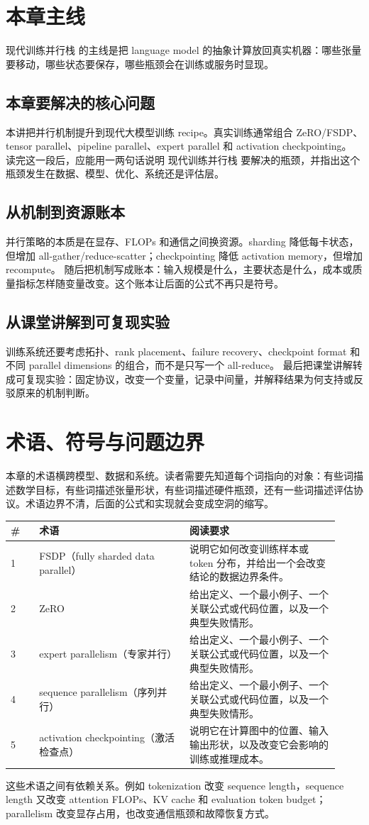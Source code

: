 \documentclass[a4paper]{article}
\begin{document}
\section{本章主线}
现代训练并行栈 的主线是把 language model 的抽象计算放回真实机器：哪些张量要移动，哪些状态要保存，哪些瓶颈会在训练或服务时显现。
\subsection{本章要解决的核心问题}
本讲把并行机制提升到现代大模型训练 recipe。真实训练通常组合 ZeRO/FSDP、tensor parallel、pipeline parallel、expert parallel 和 activation checkpointing。
读完这一段后，应能用一两句话说明 现代训练并行栈 要解决的瓶颈，并指出这个瓶颈发生在数据、模型、优化、系统还是评估层。
\subsection{从机制到资源账本}
并行策略的本质是在显存、FLOPs 和通信之间换资源。sharding 降低每卡状态，但增加 all-gather/reduce-scatter；checkpointing 降低 activation memory，但增加 recompute。
随后把机制写成账本：输入规模是什么，主要状态是什么，成本或质量指标怎样随变量改变。这个账本让后面的公式不再只是符号。
\subsection{从课堂讲解到可复现实验}
训练系统还要考虑拓扑、rank placement、failure recovery、checkpoint format 和不同 parallel dimensions 的组合，而不是只写一个 all-reduce。
最后把课堂讲解转成可复现实验：固定协议，改变一个变量，记录中间量，并解释结果为何支持或反驳原来的机制判断。
\section{术语、符号与问题边界}
本章的术语横跨模型、数据和系统。读者需要先知道每个词指向的对象：有些词描述数学目标，有些词描述张量形状，有些词描述硬件瓶颈，还有一些词描述评估协议。术语边界不清，后面的公式和实现就会变成空洞的缩写。
\begin{longtable}{p{0.08\linewidth}p{0.42\linewidth}p{0.42\linewidth}}
\toprule
\textbf{\#} & \textbf{术语} & \textbf{阅读要求}\\
\midrule
1 & FSDP（fully sharded data parallel） & 说明它如何改变训练样本或 token 分布，并给出一个会改变结论的数据边界条件。\\
2 & ZeRO & 给出定义、一个最小例子、一个关联公式或代码位置，以及一个典型失败情形。\\
3 & expert parallelism（专家并行） & 给出定义、一个最小例子、一个关联公式或代码位置，以及一个典型失败情形。\\
4 & sequence parallelism（序列并行） & 给出定义、一个最小例子、一个关联公式或代码位置，以及一个典型失败情形。\\
5 & activation checkpointing（激活检查点） & 说明它在计算图中的位置、输入输出形状，以及改变它会影响的训练或推理成本。\\
\bottomrule
\end{longtable}
这些术语之间有依赖关系。例如 tokenization 改变 sequence length，sequence length 又改变 attention FLOPs、KV cache 和 evaluation token budget；parallelism 改变显存占用，也改变通信瓶颈和故障恢复方式。
\end{document}
